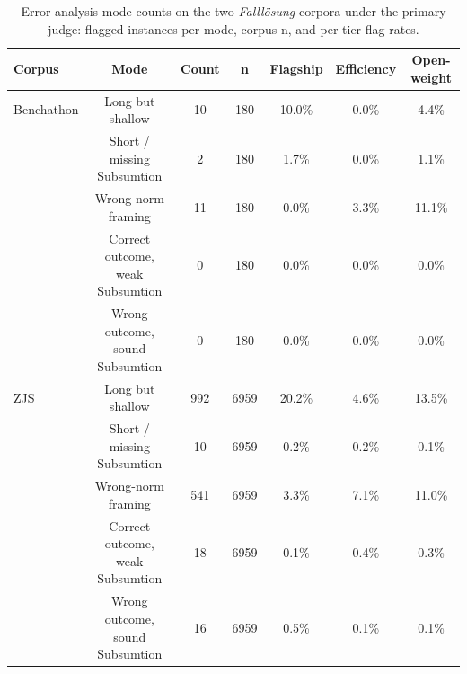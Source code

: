 \begin{table}[t]
\centering\footnotesize
\caption{Error-analysis mode counts on the two \emph{Falll\"osung} corpora under the primary judge: flagged instances per mode, corpus n, and per-tier flag rates.}
\label{tbl-error-modes-falloesung}
\setlength{\tabcolsep}{4pt}
\begin{tabular*}{\textwidth}{@{\extracolsep{\fill}}lcccccc@{}}
\toprule
Corpus & Mode & Count & n & Flagship & Efficiency & Open-weight \\
\midrule
Benchathon & Long but shallow & 10 & 180 & 10.0\% & 0.0\% & 4.4\% \\
 & Short / missing Subsumtion & 2 & 180 & 1.7\% & 0.0\% & 1.1\% \\
 & Wrong-norm framing & 11 & 180 & 0.0\% & 3.3\% & 11.1\% \\
 & Correct outcome, weak Subsumtion & 0 & 180 & 0.0\% & 0.0\% & 0.0\% \\
 & Wrong outcome, sound Subsumtion & 0 & 180 & 0.0\% & 0.0\% & 0.0\% \\
ZJS & Long but shallow & 992 & 6959 & 20.2\% & 4.6\% & 13.5\% \\
 & Short / missing Subsumtion & 10 & 6959 & 0.2\% & 0.2\% & 0.1\% \\
 & Wrong-norm framing & 541 & 6959 & 3.3\% & 7.1\% & 11.0\% \\
 & Correct outcome, weak Subsumtion & 18 & 6959 & 0.1\% & 0.4\% & 0.3\% \\
 & Wrong outcome, sound Subsumtion & 16 & 6959 & 0.5\% & 0.1\% & 0.1\% \\
\bottomrule
\end{tabular*}
\end{table}
